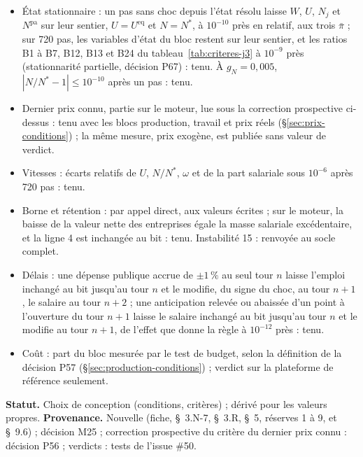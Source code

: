 \documentclass[11pt,a4paper]{article}
\begin{document}
\begin{itemize}
\item État stationnaire : un pas sans choc depuis l'état résolu laisse $W$, $U$, $N_j$ et $N^{\mathrm{pa}}$ sur leur sentier, $U = U^{\mathrm{eq}}$ et $N = N^{\ast}$, à $10^{-10}$ près en relatif, aux trois $\bar\pi$ ; sur 720 pas, les variables d'état du bloc restent sur leur sentier, et les ratios B1 à B7, B12, B13 et B24 du tableau~\ref{tab:criteres-j3} à $10^{-9}$ près (stationnarité partielle, décision P67) : tenu. À $g_N = 0{,}005$, $|N/N^{\ast} - 1| \le 10^{-10}$ après un pas : tenu.
\item Dernier prix connu, partie sur le moteur, lue sous la correction prospective ci-dessus : tenu avec les blocs production, travail et prix réels (\S\ref{sec:prix-conditions}) ; la même mesure, prix exogène, est publiée sans valeur de verdict.
\item Vitesses : écarts relatifs de $U$, $N/N^{\ast}$, $\omega$ et de la part salariale sous $10^{-6}$ après 720 pas : tenu.
\item Borne et rétention : par appel direct, aux valeurs écrites ; sur le moteur, la baisse de la valeur nette des entreprises égale la masse salariale excédentaire, et la ligne 4 est inchangée au bit : tenu. Instabilité 15 : renvoyée au socle complet.
\item Délais : une dépense publique accrue de $\pm 1\,\%$ au seul tour $n$ laisse l'emploi inchangé au bit jusqu'au tour $n$ et le modifie, du signe du choc, au tour $n + 1$, le salaire au tour $n + 2$ ; une anticipation relevée ou abaissée d'un point à l'ouverture du tour $n + 1$ laisse le salaire inchangé au bit jusqu'au tour $n$ et le modifie au tour $n + 1$, de l'effet que donne la règle à $10^{-12}$ près : tenu.
\item Coût : part du bloc mesurée par le test de budget, selon la définition de la décision P57 (\S\ref{sec:production-conditions}) ; verdict sur la plateforme de référence seulement.
\end{itemize}

\textbf{Statut.} Choix de conception (conditions, critères) ; dérivé pour les valeurs propres. \textbf{Provenance.} Nouvelle (fiche, \S~3.N-7, \S~3.R, \S~5, réserves 1 à 9, et \S~9.6) ; décision M25 ; correction prospective du critère du dernier prix connu : décision P56 ; verdicts : tests de l'issue \#50.
\end{document}
